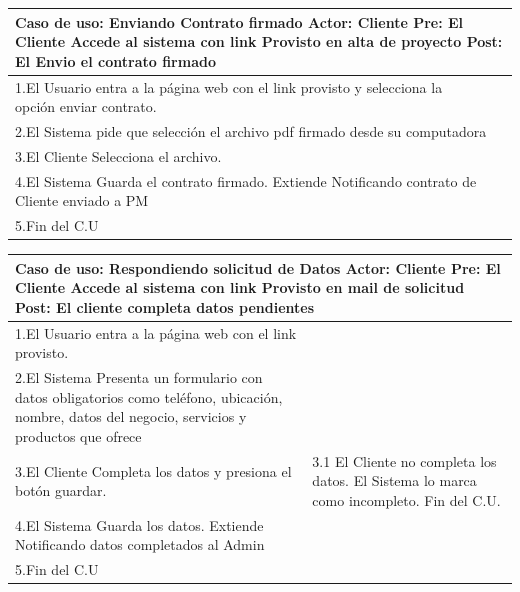 \begin{longtable}{|p{}|p{}|}
    \hline
    \multicolumn{2}{|p{16cm}|}{
        \textbf{Caso de uso:} Enviando Contrato firmado \newline
        \textbf{Actor:} Cliente\newline
        \textbf{Pre: }El Cliente Accede al sistema con link Provisto en alta de proyecto\newline
        \textbf{Post: }El Envio el contrato firmado
    }\\
    \hline
    1.El Usuario entra a la página web con el link provisto y selecciona la opción enviar contrato.&\\
    \hline
    2.El Sistema pide que selección el archivo pdf firmado desde su computadora&    \\
    \hline
    3.El Cliente Selecciona el archivo.& \\
    \hline
    4.El Sistema Guarda el contrato firmado. Extiende Notificando contrato de Cliente enviado a PM&\\
    \hline
    5.Fin del C.U&\\
    \hline
\end{longtable}

\begin{longtable}{|p{}|p{}|}
    \hline
    \multicolumn{2}{|p{16cm}|}{
        \textbf{Caso de uso:} Respondiendo solicitud de Datos \newline
        \textbf{Actor:} Cliente\newline
        \textbf{Pre: }El Cliente Accede al sistema con link Provisto en mail de solicitud\newline
        \textbf{Post: }El cliente completa datos pendientes
    }\\
    \hline
    1.El Usuario entra a la página web con el link provisto.&\\
    \hline
    2.El Sistema Presenta un formulario con datos obligatorios como teléfono, ubicación, nombre, datos del negocio, servicios y productos que ofrece &    \\
    \hline
    3.El Cliente Completa los datos y presiona el botón guardar. &3.1 El Cliente no completa los datos.\newline 3.2 El Sistema lo marca como incompleto.\newline 3.3 Fin del C.U.\\
    \hline
    4.El Sistema Guarda los datos. Extiende Notificando datos completados al Admin&\\
    \hline
    5.Fin del C.U&\\
    \hline
\end{longtable}


